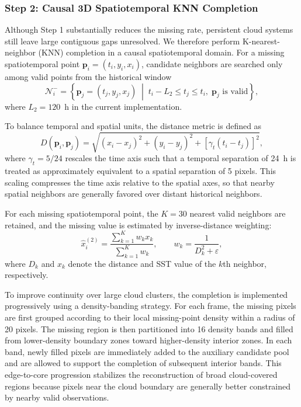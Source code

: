 \documentclass[12pt,reqno]{amsart}
\begin{document}
\subsubsection*{Step 2: Causal 3D Spatiotemporal KNN Completion}

Although Step 1 substantially reduces the missing rate, persistent cloud systems still leave large contiguous gaps unresolved. We therefore perform K-nearest-neighbor (KNN) completion in a causal spatiotemporal domain. For a missing spatiotemporal point $\mathbf{p}_i=(t_i,y_i,x_i)$, candidate neighbors are searched only among valid points from the historical window
\begin{equation}
\mathcal{N}^{-}_{i}=
\left\{
\mathbf{p}_j=(t_j,y_j,x_j)
\;\middle|\;
t_i-L_2 \le t_j \le t_i,\;
\mathbf{p}_j \text{ is valid}
\right\},
\end{equation}
where $L_2=120$~h in the current implementation.

To balance temporal and spatial units, the distance metric is defined as
\begin{equation}
D(\mathbf{p}_i,\mathbf{p}_j)=
\sqrt{
(x_i-x_j)^2+(y_i-y_j)^2+\left[\gamma_t(t_i-t_j)\right]^2
},
\end{equation}
where $\gamma_t=5/24$ rescales the time axis such that a temporal separation of 24~h is treated as approximately equivalent to a spatial separation of 5 pixels. This scaling compresses the time axis relative to the spatial axes, so that nearby spatial neighbors are generally favored over distant historical neighbors.

For each missing spatiotemporal point, the $K=30$ nearest valid neighbors are retained, and the missing value is estimated by inverse-distance weighting:
\begin{equation}
\hat{x}^{(2)}_i=
\frac{\sum_{k=1}^{K} w_k x_k}{\sum_{k=1}^{K} w_k},
\qquad
w_k=\frac{1}{D_k^2+\varepsilon},
\end{equation}
where $D_k$ and $x_k$ denote the distance and SST value of the $k$th neighbor, respectively.

To improve continuity over large cloud clusters, the completion is implemented progressively using a density-banding strategy. For each frame, the missing pixels are first grouped according to their local missing-point density within a radius of 20 pixels. The missing region is then partitioned into 16 density bands and filled from lower-density boundary zones toward higher-density interior zones. In each band, newly filled pixels are immediately added to the auxiliary candidate pool and are allowed to support the completion of subsequent interior bands. This edge-to-core progression stabilizes the reconstruction of broad cloud-covered regions because pixels near the cloud boundary are generally better constrained by nearby valid observations.
\end{document}
